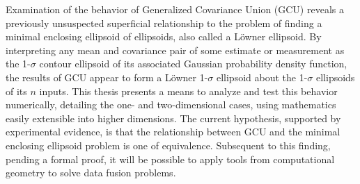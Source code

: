 \hspace{15pt} Examination of the behavior of Generalized Covariance Union (GCU) reveals a previously unsuspected superficial
relationship to the problem of finding a minimal enclosing ellipsoid of ellipsoids, also called a L\"owner ellipsoid. By
interpreting any mean and covariance pair of some estimate or measurement as the 1-$\sigma$ contour ellipsoid of its
associated Gaussian probability density function, the results of GCU appear to form a L\"owner 1-$\sigma$ ellipsoid
about the 1-$\sigma$ ellipsoids of its $n$ inputs. This thesis presents a means to analyze and test this behavior
numerically, detailing the one- and two-dimensional cases, using mathematics easily extensible into higher dimensions.
The current hypothesis, supported by experimental evidence, is that the relationship between GCU and the minimal
enclosing ellipsoid problem is one of equivalence. Subsequent to this finding, pending a formal proof, it will be
possible to apply tools from computational geometry to solve data fusion problems.

